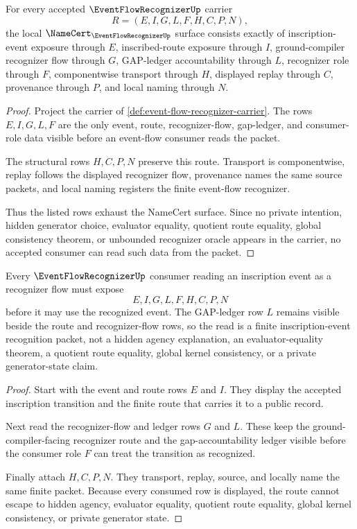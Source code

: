 \begin{theorem}
\label{thm:event-flow-recognizer-namecert-obligations}
For every accepted $\EventFlowRecognizerUp$ carrier
$$
R=(E,I,G,L,F,H,C,P,N),
$$
the local $\NameCert_{\EventFlowRecognizerUp}$ surface consists exactly of inscription-event exposure through $E$, inscribed-route exposure through $I$, ground-compiler recognizer flow through $G$, GAP-ledger accountability through $L$, recognizer role through $F$, componentwise transport through $H$, displayed replay through $C$, provenance through $P$, and local naming through $N$.
\end{theorem}
\begin{proof}
Project the carrier of \autoref{def:event-flow-recognizer-carrier}. The rows $E,I,G,L,F$ are the only event, route, recognizer-flow, gap-ledger, and consumer-role data visible before an event-flow consumer reads the packet.

The structural rows $H,C,P,N$ preserve this route. Transport is componentwise, replay follows the displayed recognizer flow, provenance names the same source packets, and local naming registers the finite event-flow recognizer.

Thus the listed rows exhaust the NameCert surface. Since no private intention, hidden generator choice, evaluator equality, quotient route equality, global consistency theorem, or unbounded recognizer oracle appears in the carrier, no accepted consumer can read such data from the packet.
\end{proof}

\begin{theorem}
\label{thm:event-flow-recognizer-ledger-nonescape}
Every $\EventFlowRecognizerUp$ consumer reading an inscription event as a recognizer flow must expose
$$
E,I,G,L,F,H,C,P,N
$$
before it may use the recognized event. The GAP-ledger row $L$ remains visible beside the route and recognizer-flow rows, so the read is a finite inscription-event recognition packet, not a hidden agency explanation, an evaluator-equality theorem, a quotient route equality, global kernel consistency, or a private generator-state claim.
\end{theorem}
\begin{proof}
Start with the event and route rows $E$ and $I$. They display the accepted inscription transition and the finite route that carries it to a public record.

Next read the recognizer-flow and ledger rows $G$ and $L$. These keep the ground-compiler-facing recognizer route and the gap-accountability ledger visible before the consumer role $F$ can treat the transition as recognized.

Finally attach $H,C,P,N$. They transport, replay, source, and locally name the same finite packet. Because every consumed row is displayed, the route cannot escape to hidden agency, evaluator equality, quotient route equality, global kernel consistency, or private generator state.
\end{proof}

